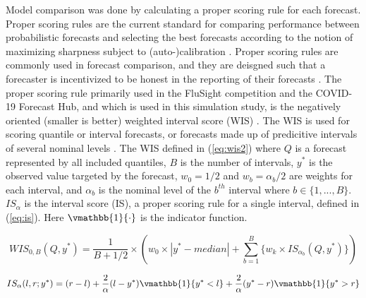 Model comparison was done by calculating a proper scoring rule for each 
forecast.
Proper scoring rules are the 
current standard for comparing performance between probabilistic forecasts 
and selecting the best forecasts according to the notion of maximizing 
sharpness subject to (auto-)calibration 
\cite[]{gneiting2007probabilistic, tsyplakov2013evaluation}. Proper scoring 
rules are commonly used in forecast comparison, and they are deisgned such 
that a 
forecaster is incentivized to be honest in the reporting of their forecasts 
\cite[]{gneiting2007strictly, gneiting2014probabilistic}.
The proper scoring rule primarily used in the FluSight competition and the 
COVID-19 Forecast Hub, and which is used in this simulation study,
is the negatively oriented
(smaller is better)
weighted interval score (WIS)
\cite[]{mathis2024evaluation, bracher2021evaluating}.
The WIS is used for scoring quantile or interval 
forecasts, or forecasts made up of predicitive intervals of several nominal 
levels
\cite[]{gneiting2007strictly, gneiting2014probabilistic, bracher2021evaluating}. 
The WIS defined in (\ref{eq:wis2}) where $Q$ is a forecast represented by all 
included quantiles, $B$ is the number of intervals,  $y^*$ is the observed 
value targeted by the forecast, $w_0 = 1/2$ and $w_b = \alpha_b / 2$ are 
weights for each interval, and $\alpha_b$ is the nominal level of the $b^{th}$ 
interval where $b \in \{1, ..., B\}$. 
$IS_{\alpha}$ is the interval score (IS), a proper scoring rule for a 
single interval, defined in (\ref{eq:is}). Here 
$\vmathbb{1}\{\cdot\}$ is the indicator function.


\begin{equation}
\label{eq:wis2}
        WIS_{0,B}(Q, y^*) = \frac{1}{B + 1/2} \times (w_0\times |y^* - median| + \sum_{b=1}^B \{w_k \times IS_{\alpha_b}(Q, y^*) \} )
\end{equation}

\begin{equation}
\label{eq:is}
        IS_{\alpha}(l,r;y^*) = (r-l) + \frac{2}{\alpha}(l - y^*)\vmathbb{1}\{y^* < l\} + \frac{2}{\alpha}(y^* - r) \vmathbb{1}\{y^* > r\}
\end{equation}


% 



